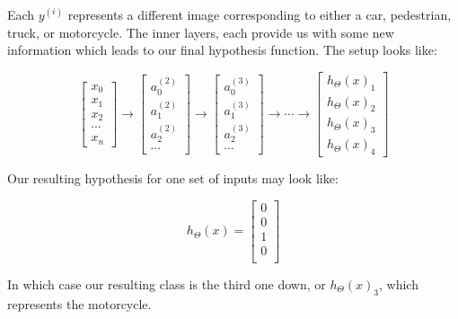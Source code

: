 \documentclass[UTF8]{article}
\begin{document}
Each $y^{(i)}$ represents a different image corresponding to either a car, pedestrian, truck, or motorcycle. The inner layers, each provide us with some new information which leads to our final hypothesis function. The setup looks like:

$$\begin{bmatrix}x_0 \\ x_1 \\ x_2 \\ \cdots \\ x_n \end{bmatrix} \rightarrow \begin{bmatrix}a^{(2)}_0 \\ a^{(2)}_1 \\ a^{(2)}_2 \\ \cdots \end{bmatrix} \rightarrow \begin{bmatrix}a^{(3)}_0 \\ a^{(3)}_1 \\ a^{(3)}_2 \\ \cdots \end{bmatrix} \rightarrow \cdots \rightarrow \begin{bmatrix}h_\Theta(x)_1 \\ h_\Theta(x)_2 \\ h_\Theta(x)_3 \\ h_\Theta(x)_4 \end{bmatrix}$$

Our resulting hypothesis for one set of inputs may look like:

$$h_\Theta(x) =\begin{bmatrix}0 \\ 0 \\ 1 \\ 0 \\\end{bmatrix}$$

In which case our resulting class is the third one down, or $h_\Theta(x)_3$, which represents the motorcycle.
\end{document}
